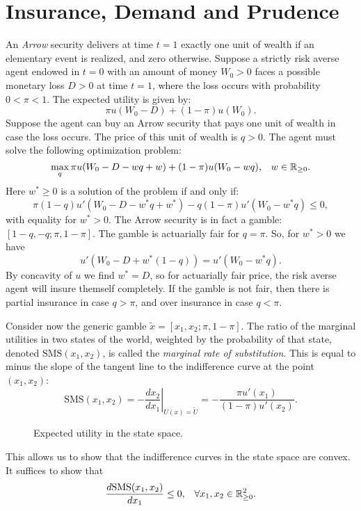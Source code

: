\documentclass[twoside]{article}
\begin{document}
\section{Insurance, Demand and Prudence}
An \textit{Arrow} security delivers at time $t=1$ exactly one unit of wealth if an elementary event is realized, and zero otherwise. Suppose a strictly risk averse agent endowed in $t=0$ with an amount of money $W_0>0$ faces a possible monetary loss $D>0$ at time $t=1$, where the loss occurs with probability $0 < \pi < 1$. The expected utility is given by:
\[
    \pi u(W_0 - D) + (1-\pi)u(W_0).
\]
Suppose the agent can buy an Arrow security that pays one unit of wealth in case the loss occurs. The price of this unit of wealth is $q>0$. The agent must solve the following optimization problem:
\[
    \max_{q} \pi u(W_0 - D - wq + w) + (1-\pi)u(W_0 - wq), \;\;\; w \in \mathbb{R}_{\geq 0}.
\]
Here $w^* \geq 0$ is a solution of the problem if and only if:
\[
    \pi(1-q) u'(W_0 - D - w^*q + w^*) - q(1-\pi)u'(W_0 - w^*q) \leq 0,
\]
with equality for $w^* > 0$. The Arrow security is in fact a gamble: $[1-q, -q; \pi, 1-\pi]$. The gamble is actuarially fair for $q = \pi$. So, for $w^* > 0$ we have
\[
    u'\left(W_0 - D + w^*(1-q)\right) = u'\left(W_0 - w^*q\right).
\]
By concavity of $u$ we find $w^* = D$, so for actuarially fair price, the risk averse agent will insure themself completely. If the gamble is not fair, then there is partial insurance in case $q > \pi$, and over insurance in case $q < \pi$.

Consider now the generic gamble $\tilde{x} = [x_1, x_2; \pi, 1-\pi]$. The ratio of the marginal utilities in two states of the world, weighted by the probability of that state, denoted $\text{SMS}(x_1, x_2)$, is called the \textit{marginal rate of substitution}. This is equal to minus the slope of the tangent line to the indifference curve at the point $(x_1, x_2)$:
\[
    \text{SMS}(x_1, x_2) = \left.-\frac{dx_2}{dx_1}\right|_{U(x) = \tilde{U}} = - \frac{\pi u'(x_1)}{(1-\pi)u'(x_2)}.
\]
\begin{figure}[ht]
    \centering
    \caption{Expected utility in the state space. }
    \label{fig:insurance}
\end{figure}
This allows us to show that the indifference curves in the state space are convex. It suffices to show that
\[
    \frac{d\text{SMS}(x_1, x_2)}{dx_1} \leq 0, \;\;\; \forall x_1, x_2 \in \mathbb{R}^2_{\geq 0}.
\]
\end{document}
